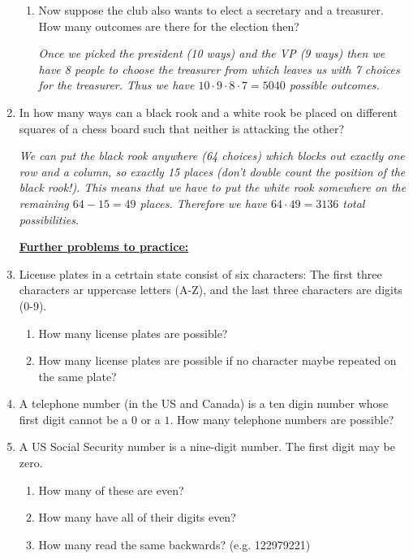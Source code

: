 \documentclass[11pt]{preprint}
\begin{document}
\begin{enumerate}
\begin{enumerate}
\item Now suppose the club also wants to elect a secretary and a treasurer. How many outcomes are there for the election then?

\vspace{0.1cm}
\textit{Once we picked the president (10 ways) and the VP (9 ways) then we have 8 people to choose the treasurer from which leaves us with 7 choices for the treasurer. Thus we have $10\cdot 9\cdot 8\cdot 7=5040$ possible outcomes.}
\vspace{0.1cm}
\end{enumerate}

\item In how many ways can a black rook and a white rook be placed on different squares of a chess board such that neither is attacking the other?

\vspace{0.1cm}
\textit{We can put the black rook anywhere (64 choices) which blocks out exactly one row and a column, so exactly 15 places (don't double count the position of the black rook!). This means that we have to put the white rook somewhere on the remaining $64-15=49$ places. Therefore we have $64\cdot 49 =3136$ total possibilities. }
\vspace{0.2cm}

\noindent\underline{\textbf{Further problems to practice:}}
\vspace{0.1cm}

\item License plates in a cetrtain state consist of six characters: The first three characters ar uppercase letters (A-Z), and the last three characters are digits (0-9).
\begin{enumerate}
\item How many license plates are possible?
\item How many license plates are possible if no character maybe repeated on the same plate?
\end{enumerate}

\item A telephone number (in the US and Canada) is a ten digin number whose first digit cannot be a $0$ or a $1$. How many telephone numbers are possible?

\item A US Social Security number is a nine-digit number. The first digit may be zero.
\begin{enumerate}
\item How many of these are even?
\item How many have all of their digits even?
\item How many read the same backwards? (e.g. 122979221)
\end{enumerate}

\end{enumerate}
\end{document}
